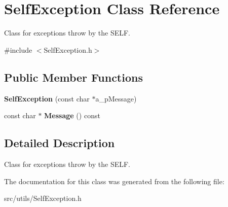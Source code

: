 \hypertarget{class_self_exception}{}\section{Self\+Exception Class Reference}
\label{class_self_exception}


Class for exceptions throw by the S\+E\+LF.  




{\ttfamily \#include $<$Self\+Exception.\+h$>$}

\subsection*{Public Member Functions}
\begin{DoxyCompactItemize}
\item 
\mbox{\label{class_self_exception_a70452697070f96a406b39a06cf8a58cd}} 
{\bfseries Self\+Exception} (const char $\ast$a\+\_\+p\+Message)
\item 
\mbox{\label{class_self_exception_a7a9943c9bd1746a930d9db81aaf1b7fa}} 
const char $\ast$ {\bfseries Message} () const
\end{DoxyCompactItemize}


\subsection{Detailed Description}
Class for exceptions throw by the S\+E\+LF. 

The documentation for this class was generated from the following file\+:\begin{DoxyCompactItemize}
\item 
src/utils/Self\+Exception.\+h\end{DoxyCompactItemize}
